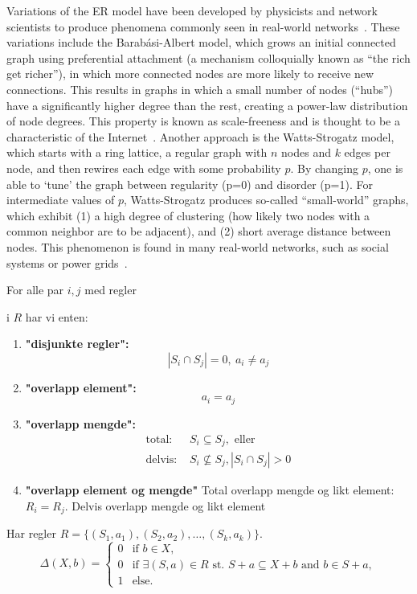 Variations of the ER model have been developed by physicists and network scientists to produce phenomena commonly seen in real-world networks~\cite{fienberg-2012}. These variations include the Barabási-Albert model, which grows an initial connected graph using preferential attachment (a mechanism colloquially known as ``the rich get richer''), in which more connected nodes are more likely to receive new connections. This results in graphs in which a small number of nodes (``hubs'') have a significantly higher degree than the rest, creating a power-law distribution of node degrees. This property is known as scale-freeness and is thought to be a characteristic of the Internet~\cite{barabasi-albert}. Another approach is the Watts-Strogatz model, which starts with a ring lattice, a regular graph with $n$ nodes and $k$ edges per node, and then rewires each edge with some probability $p$. By changing $p$, one is able to `tune' the graph between regularity (p=0) and disorder (p=1). For intermediate values of $p$, Watts-Strogatz produces so-called ``small-world'' graphs, which exhibit (1) a high degree of clustering (how likely two nodes with a common neighbor are to be adjacent), and (2) short average distance between nodes. This phenomenon is found in many real-world networks, such as social systems or power grids~\cite{Watts-1998}.

\pagebreak




For alle par $i,j$ med regler 

i $R$ har vi enten:
\begin{enumerate}
  \item \textbf{"disjunkte regler":} $$|S_i \cap S_j| = 0,\ a_i \neq a_j$$
  \item \textbf{"overlapp element":} $$a_i = a_j$$
  \item \textbf{"overlapp mengde":}
  $$
  \begin{aligned}
    \mbox{total: }  &S_i \subseteq S_j, \mbox{ eller} \\
    \mbox{delvis: } &S_i \not \subseteq S_j, |S_i \cap S_j| > 0
  \end{aligned}
  $$
  \item \textbf{"overlapp element og mengde"}
  \subitem Total overlapp mengde og likt element: $R_i = R_j$.
  \subitem Delvis overlapp mengde og likt element
\end{enumerate}



Har regler $R = \{ (S_1, a_1), (S_2, a_2), \dots, (S_k, a_k) \}$. 
$$
\Delta(X, b) = \begin{cases}
  0 & \mbox{if } b \in X, \\
  0 & \mbox{if } \exists(S, a) \in R \mbox{ st. } S+a \subseteq X+b \mbox{ and } b \in S+a, \\
  1 & \mbox{else.}
\end{cases}
$$
